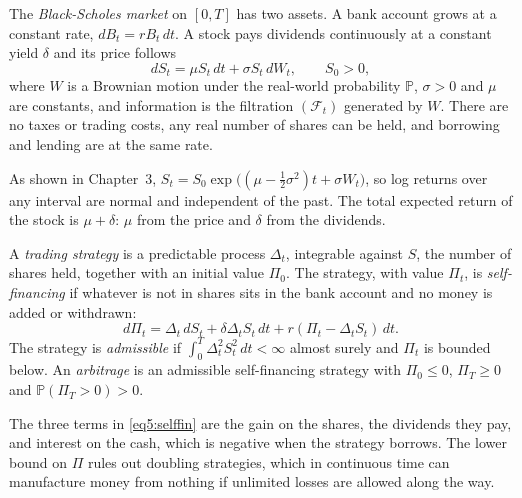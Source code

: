 \begin{chapterrefs}
\begin{definition}\label{def5:market}
The \emph{Black-Scholes market} on $[0,T]$ has two assets. A bank account grows at a constant rate,
$dB_t=rB_t\,dt$. A stock pays dividends continuously at a constant yield $\delta$ and its price follows
\begin{equation}\label{eq5:gbm}
  dS_t=\mu S_t\,dt+\sigma S_t\,dW_t,\qquad S_0>0,
\end{equation}
where $W$ is a Brownian motion under the real-world probability $\mathbb P$, $\sigma>0$ and $\mu$ are
constants, and information is the filtration $(\mathcal F_t)$ generated by $W$. There are no taxes or
trading costs, any real number of shares can be held, and borrowing and lending are at the same rate.
\end{definition}

As shown in Chapter~3, $S_t=S_0\exp\bigl((\mu-\tfrac12\sigma^2)t+\sigma W_t\bigr)$, so log returns over
any interval are normal and independent of the past. The total expected return of the stock is
$\mu+\delta$: $\mu$ from the price and $\delta$ from the dividends.

\begin{definition}\label{def5:selffin}
A \emph{trading strategy} is a predictable process $\Delta_t$, integrable against $S$, the number of shares held, together with an
initial value $\Pi_0$. The strategy, with value $\Pi_t$, is \emph{self-financing} if whatever is not in shares sits in
the bank account and no money is added or withdrawn:
\begin{equation}\label{eq5:selffin}
  d\Pi_t=\Delta_t\,dS_t+\delta\Delta_tS_t\,dt+r(\Pi_t-\Delta_tS_t)\,dt .
\end{equation}
The strategy is \emph{admissible} if $\int_0^T\Delta_t^2S_t^2\,dt<\infty$ almost surely and $\Pi_t$ is
bounded below. An \emph{arbitrage} is an admissible self-financing strategy with $\Pi_0\le0$,
$\Pi_T\ge0$ and $\mathbb P(\Pi_T>0)>0$.
\end{definition}

The three terms in \cref{eq5:selffin} are the gain on the shares, the dividends they pay, and interest
on the cash, which is negative when the strategy borrows. The lower bound on $\Pi$ rules out doubling
strategies, which in continuous time can manufacture money from nothing if unlimited losses are
allowed along the way.


\end{chapterrefs}
